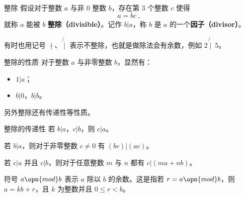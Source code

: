 
\begin{definition}{整除}
假设对于整数 $a$ 与非 $0$ 整数 $b$，存在第 $3$ 个整数 $c$ 使得
\begin{equation}
a = bc ~,
\end{equation}
就称 $a$ 能被 $b$ \textbf{整除（divisible）}。记作 $b | a$，称 $b$ 是 $a$ 的一个\textbf{因子（divisor）}。
\end{definition}

有时也用记号 $\nmid$、$\not{\mid}$ 表示不整除，也就是做除法会有余数，例如 $2 \not{\mid}~ 5 $。

\begin{corollary}{整除的性质}
对于整数 $a$ 与非零整数 $b$，显然有：
\begin{itemize}
\item $1 | a$；
\item $b | 0$，$b | b$。
\end{itemize}
\end{corollary}

另外整除还有传递性等性质。
\begin{theorem}{整除的传递性}
若 $b|a$，$c|b$，则 $c|a$。
\end{theorem}
\begin{theorem}{}
若 $b|a$，则对于非零整数 $c \neq 0$ 有 $(bc) | (ac)$。
\end{theorem}
\begin{theorem}{}
若 $c|a$ 并且 $c|b$，则对于任意整数 $m$ 与 $n$ 都有 $c | (ma + nb)$。
\end{theorem}

\begin{definition}{}
符号 $a \opn{mod} b$ 表示 $a$ 除以 $b$ 的余数。这是指若 $r = a \opn{mod} b$，则 $a = kb + r$，且 $k$ 为整数并且 $0 \le r < b$。
\end{definition}